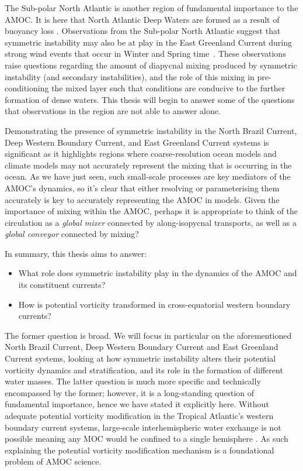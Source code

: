 
The Sub-polar North Atlantic is another region of fundamental importance to the AMOC. It is here that North Atlantic Deep Waters are formed as a result of buoyancy loss \citep[e.g.]{Marshall1999, Pickart2003, DeJong2016, Lozier2019}. Observations from the Sub-polar North Atlantic suggest that symmetric instability may also be at play in the East Greenland Current during strong wind events that occur in Winter and Spring time~\citep{LeBras2022}. These observations raise questions regarding the amount of diapycnal mixing produced by symmetric instability (and secondary instabilities), and the role of this mixing in pre-conditioning the mixed layer such that conditions are conducive to the further formation of dense waters. This thesis will begin to answer some of the questions that observations in the region are not able to answer alone.

Demonstrating the presence of symmetric instability in the North Brazil Current, Deep Western Boundary Current, and East Greenland Current systems is significant as it highlights regions where coarse-resolution ocean models and climate models may not accurately represent the mixing that is occurring in the ocean. As we have just seen, such small-scale processes are key mediators of the AMOC's dynamics, so it's clear that either resolving or parameterising them accurately is key to accurately representing the AMOC in models. Given the importance of mixing within the AMOC, perhaps it is appropriate to think of the circulation as a \textit{global mixer} connected by along-isopycnal transports, as well as a \textit{global conveyor} connected by mixing?

In summary, this thesis aims to answer:
\begin{itemize}
    \item What role does symmetric instability play in the dynamics of the AMOC and its constituent currents?
    \item How is potential vorticity transformed in cross-equatorial western boundary currents?
\end{itemize}
The former question is broad. We will focus in particular on the aforementioned North Brazil Current, Deep Western Boundary Current and East Greenland Current systems, looking at how symmetric instability alters their potential vorticity dynamics and stratification, and its role in the formation of different water masses. The latter question is much more specific and technically encompassed by the former; however, it is a long-standing question of fundamental importance, hence we have stated it explicitly here. Without adequate potential vorticity modification in the Tropical Atlantic's western boundary current systems, large-scale interhemispheric water exchange is not possible meaning any MOC would be confined to a single hemisphere \citep{Csanady1985,  Nof1990, Killworth1991, Johnson1993}. As such explaining the potential vorticity modification mechanism is a foundational problem of AMOC science.

